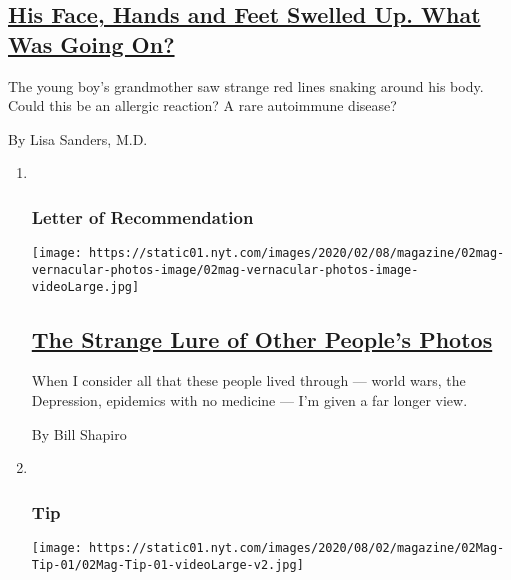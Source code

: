 \begin{enumerate}
  \hypertarget{his-face-hands-and-feet-swelled-up-what-was-going-on}{%
  \subsection{\texorpdfstring{\href{/2020/07/30/magazine/urticaria-multiforme.html}{His
  Face, Hands and Feet Swelled Up. What Was Going
  On?}}{His Face, Hands and Feet Swelled Up. What Was Going On?}}\label{his-face-hands-and-feet-swelled-up-what-was-going-on}}

  The young boy's grandmother saw strange red lines snaking around his
  body. Could this be an allergic reaction? A rare autoimmune disease?

  By Lisa Sanders, M.D.
\end{enumerate}

\begin{enumerate}
\def\labelenumi{\arabic{enumi}.}
\item ~
  \hypertarget{letter-of-recommendation}{%
  \subsubsection{Letter of
  Recommendation}\label{letter-of-recommendation}}

  \texttt{[image: https://static01.nyt.com/images/2020/02/08/magazine/02mag-vernacular-photos-image/02mag-vernacular-photos-image-videoLarge.jpg]}

  \hypertarget{the-strange-lure-of-other-peoples-photos}{%
  \subsection{\texorpdfstring{\href{/2020/07/30/magazine/the-strange-lure-of-other-peoples-photos.html}{The
  Strange Lure of Other People's
  Photos}}{The Strange Lure of Other People's Photos}}\label{the-strange-lure-of-other-peoples-photos}}

  When I consider all that these people lived through --- world wars,
  the Depression, epidemics with no medicine --- I'm given a far longer
  view.

  By Bill Shapiro
\item ~
  \hypertarget{tip}{%
  \subsubsection{Tip}\label{tip}}

  \texttt{[image: https://static01.nyt.com/images/2020/08/02/magazine/02Mag-Tip-01/02Mag-Tip-01-videoLarge-v2.jpg]}


\end{enumerate}
